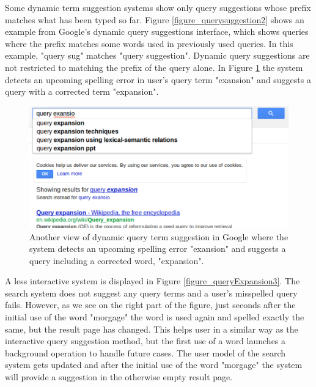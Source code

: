 \documentclass{sigchi}
\begin{document}
Some dynamic term suggestion systems show only query suggestions whose prefix matches what has been typed so far. Figure \ref{figure_querysuggestion2} shows an example from Google's dynamic query suggestions interface, which shows queries where the prefix matches some words used in previously used queries.
In this example, "query sug" matches "query suggestion".
Dynamic query suggestions are not restricted to matching the prefix of the query alone.
In Figure \ref{figure_querysuggestion3} the system detects an upcoming spelling error in user's query term "exansion" and suggests a query with a corrected term "expansion".

\begin{figure}[htp] %
\caption{Another view of dynamic query term suggestion in Google where the system detects an upcoming spelling error "exansion" and suggests a query including a corrected word, "expansion". \protect} \label{figure_querysuggestion3}
\includegraphics[scale=0.41]{figures/dynamicQueryTermSuggestion3.pdf} 
\end{figure}

A less interactive system is displayed in Figure \ref{figure_queryExpansion3}.
The search system does not suggest any query terms and a user's misspelled query fails.
However, as we see on the right part of the figure, just seconds after the initial use of the word "morgage" the word is used again and spelled exactly the same, but the result page has changed.
This helps user in a similar way as the interactive query suggestion method, but the first use of a word launches a background operation to handle future cases.
The user model of the search system gets updated and after the initial use of the word "morgage" the system will provide a suggestion in the otherwise empty result page.
\end{document}

